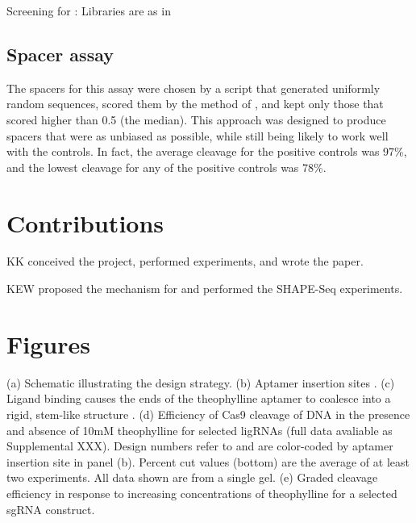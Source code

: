 \documentclass[10pt,oneside]{article}
\begin{document}
Screening for \ligrnaB{}: Libraries are as in 

\subsection{Spacer assay}

The spacers for this assay were chosen by a script that generated uniformly random sequences, scored them by the method of , and kept only those that scored higher than 0.5 (the median).  This approach was designed to produce spacers that were as unbiased as possible, while still being likely to work well with the controls.  In fact, the average cleavage for the positive controls was 97\%, and the lowest cleavage for any of the positive controls was 78\%.

\section{Contributions}

KK conceived the project, performed experiments, and wrote the paper.

KEW proposed the mechanism for \ligrnaB{} and performed the SHAPE-Seq experiments.

\section{Figures}



 (a) Schematic illustrating the design strategy.
%
%
 (b) Aptamer insertion sites \autocite{briner2014}.
%
%
 (c) Ligand binding causes the ends of the theophylline aptamer to coalesce into a rigid, stem-like structure \autocite{zimmerman1997}.
%
%
 (d) Efficiency of \invitro{} Cas9 cleavage of DNA in the presence and absence of 10mM theophylline for selected ligRNAs  (full data avaliable as Supplemental XXX).  Design numbers refer to  and are color-coded by aptamer insertion site in panel (b).  Percent cut values (bottom) are the average of at least two experiments.  All data shown are from a single gel.
%
%
 (e) Graded cleavage efficiency in response to increasing concentrations of theophylline for a selected sgRNA construct.
\end{document}
